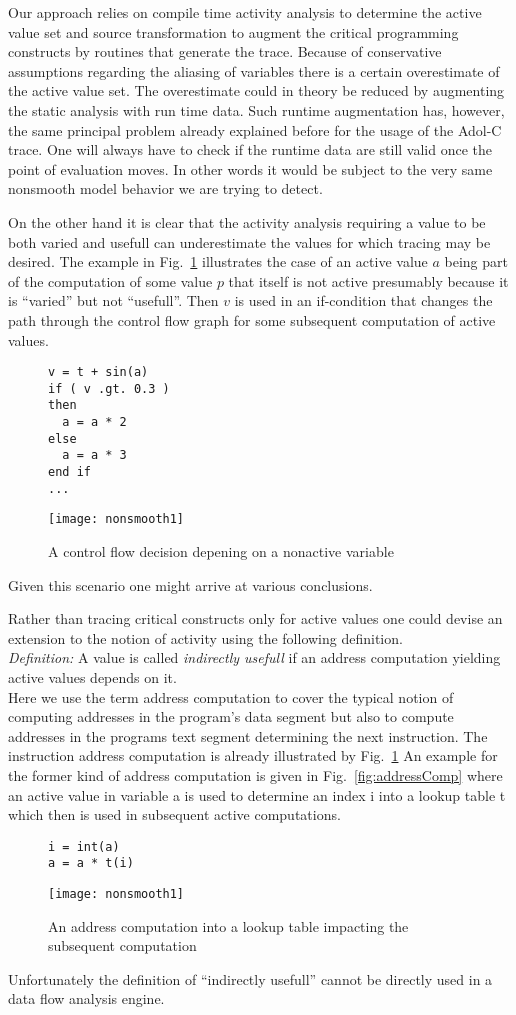 \documentclass{article}
\newcommand{\reffig}[1]{{Fig.~\ref{#1}}}
\begin{document}
Our approach relies on compile time activity analysis to determine the active value set 
and source transformation to augment the critical programming constructs by 
routines that generate the trace. 
Because of conservative assumptions regarding the 
aliasing of variables there is a certain overestimate of the active value set. 
The overestimate could in theory be reduced by augmenting the static analysis 
with run time data. 
Such runtime augmentation has,  however,  the same principal problem already 
explained before for the usage of the Adol-C trace. 
One will always have to check 
if the runtime data are still valid once the point of evaluation moves. 
In other words it would be subject to the very same nonsmooth model behavior we are trying to detect.

On the other hand it is clear that the activity  analysis requiring a value 
to be both varied and usefull can underestimate 
the values for which tracing may be desired. 
The example in \reffig{fig:missedThis} illustrates the case of an active value  $a$
being part of the computation of some value $p$ that itself is not active presumably 
because it is ``varied'' but not ``usefull''.
Then $v$ is used in an if-condition that changes the path through the control flow 
graph for some  subsequent computation of active values.
\begin{figure}
\begin{lstlisting}
v = t + sin(a) 
if ( v .gt. 0.3 )
then 
  a = a * 2
else
  a = a * 3
end if 
...
\end{lstlisting}
\texttt{[image: nonsmooth1]}
\caption{A control flow decision depening on a nonactive variable}\label{fig:missedThis} 
\end{figure}
Given this scenario one might arrive at various conclusions. 

Rather than tracing critical constructs only for  active values 
one could devise an extension to the notion of activity using the following 
definition.\\
{\em Definition: } A value is called {\em indirectly usefull} 
if an address computation yielding active values depends on it.\\
Here we use the term  address computation to cover the typical notion of 
computing addresses in the program's data segment but also to compute 
addresses in the programs text segment determining the next instruction. 
The instruction address computation is already illustrated by \reffig{fig:missedThis}
An example for the former kind of address computation is given in 
\reffig{fig:addressComp} where an active value in variable a is used to 
determine an index i into a lookup table t which then is used in 
subsequent active computations.
\begin{figure}
\begin{lstlisting}
i = int(a) 
a = a * t(i)
\end{lstlisting}
\texttt{[image: nonsmooth1]}
\caption{An address computation into a lookup table impacting the subsequent computation}\label{fig:subdomains} 
\end{figure}
Unfortunately the definition of ``indirectly usefull'' cannot be directly used in a 
data flow analysis engine. 
\end{document}
